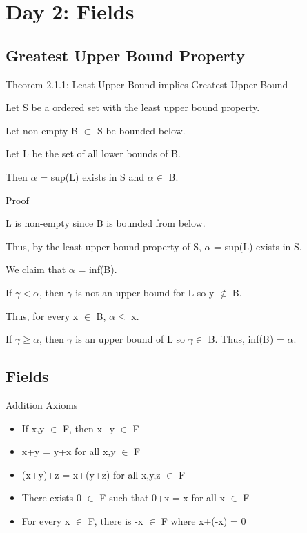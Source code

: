 \newpage
\section[Day 2: Fields]{Day 2: Fields}





\subsection{Greatest Upper Bound Property}

{ \color{red} Theorem 2.1.1: Least Upper Bound implies Greatest Upper Bound }

\begin{adjustbox}{minipage=14cm, right}
	Let S be a ordered set with the least upper bound property.

	Let non-empty B $\subset$ S be bounded below.

	Let L be the set of all lower bounds of B.

	Then $\alpha$ = sup(L) exists in S and $\alpha \in$ B.
\end{adjustbox}

{ \color{magenta} Proof }

L is non-empty since B is bounded from below.

Thus, by the least upper bound property of S, $\alpha$ = sup(L) exists in S.

We claim that $\alpha$ = inf(B).

If $\gamma < \alpha$, then $\gamma$ is not an upper bound for L so y $\not \in$ B.

Thus, for every x $\in$ B, $\alpha \leq$ x.

If $\gamma \geq \alpha$, then $\gamma$ is an upper bound of L so $\gamma \in$ B.
Thus, inf(B) = $\alpha$.





\subsection{Fields}

Addition Axioms
\begin{itemize}[leftmargin=2cm]
	\item If x,y $\in$ F, then x+y $\in$ F
	\item x+y = y+x for all x,y $\in$ F
	\item (x+y)+z = x+(y+z) for all x,y,z $\in$ F
	\item There exists 0 $\in$ F such that 0+x = x for all x $\in$ F
	\item For every x $\in$ F, there is -x $\in$ F where x+(-x) = 0
\end{itemize}


